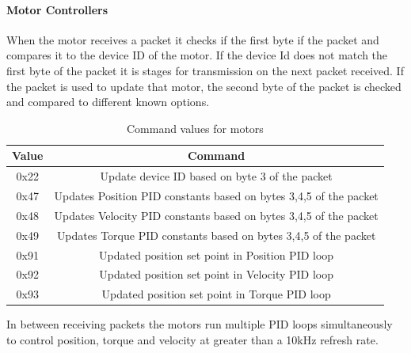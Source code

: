         \paragraph{Motor Controllers}
            When the motor receives a packet it checks if the first byte if the packet and compares it to the device ID of the motor. If the device Id does not match the first byte of the packet it is stages for transmission on the next packet received. If the packet is used to update that motor, the second byte of the packet is checked and compared to different known options. 
            \begin{table}[H]
                \centering
                \begin{tabular}{|c|c|}
                \hline
                    Value & Command \\
                    \hline
                    0x22 & Update device ID based on byte 3 of the packet\\
                    0x47 & Updates Position PID constants based on bytes 3,4,5 of the packet \\
                    0x48 & Updates Velocity PID constants based on bytes 3,4,5 of the packet \\
                    0x49 & Updates Torque PID constants based on bytes 3,4,5 of the packet \\
                    0x91 & Updated position set point in Position PID loop\\
                    0x92 & Updated position set point in Velocity PID loop\\
                    0x93 & Updated position set point in Torque PID loop\\
                    \hline
                    \end{tabular}
                \caption{Command values for motors}
                \label{tab:ServoCommandValues}
            \end{table}
            In between receiving packets the motors run multiple PID loops simultaneously to control position, torque and velocity at greater than  a 10kHz refresh rate.
